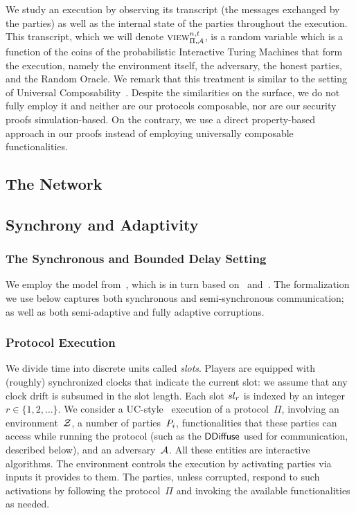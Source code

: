 We study an execution by observing its transcript (the messages exchanged by the
parties) as well as the internal state of the parties throughout the execution.
This transcript, which we will denote $\textsc{view}_{\Pi,\mathcal{A}}^{n,t}$, is a
random variable which is a function of the coins of the probabilistic
Interactive Turing Machines that form the execution, namely the environment
itself, the adversary, the honest parties, and the Random Oracle. We remark that
this treatment is similar to the setting of Universal Composability~\cite{uc}.
Despite the similarities on the surface, we do not fully employ it and neither
are our protocols composable, nor are our security proofs simulation-based. On
the contrary, we use a direct property-based approach in our proofs instead of
employing universally composable functionalities.

\subsection{The Network}

\subsection{Synchrony and Adaptivity}

\subsubsection{The Synchronous and Bounded Delay Setting}

We employ the model from~\cite{praos}, which is in turn based
on~\cite{ouroboros} and~\cite{backbone}.
The formalization we use below captures both synchronous and semi-syn\-chronous
communication; as well as both semi-adaptive and fully adaptive corruptions.

\subsubsection{Protocol Execution}
\label{sec:prelim-exec}

We divide time into discrete units called
\emph{slots}. %
Players are equipped with (roughly) synchronized clocks that
indicate the current slot: we assume that any clock drift is subsumed in the
slot length.  Each slot $sl_r$ is indexed by an integer $r \in \{1,2,\ldots
\}$.
We consider a UC-style~\cite{uc} execution of a protocol~$\Pi$,
involving an environment~$\mathcal{Z}$, a number of
parties~$P_i$, functionalities that these parties can access while running
the protocol (such as the $\mathsf{DDiffuse}$ used for communication, described below), and
an adversary~$\mathcal{A}$. All these entities are interactive algorithms.  The
environment controls the execution by activating parties via inputs it provides
to them. The parties, unless corrupted, respond to such activations by following
the protocol~$\Pi$ and invoking the available functionalities as needed.

